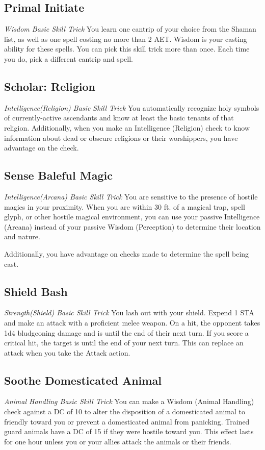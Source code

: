 \subsection{Primal Initiate}
\textit{Wisdom Basic Skill Trick}
You learn one cantrip of your choice from the Shaman list, as well as one spell costing no more than 2 AET. Wisdom is your casting ability for these spells. You can pick this skill trick more than once. Each time you do, pick a different cantrip and spell.

\subsection{Scholar: Religion}
\textit{Intelligence(Religion) Basic Skill Trick}
You automatically recognize holy symbols of currently-active ascendants and know at least the basic tenants of that religion. Additionally, when you make an Intelligence (Religion) check to know information about dead or obscure religions or their worshippers, you have advantage on the check.

\subsection{Sense Baleful Magic}
\textit{Intelligence(Arcana) Basic Skill Trick}
You are sensitive to the presence of hostile magics in your proximity. When you are within 30 ft. of a magical trap, spell glyph, or other hostile magical environment, you can use your passive Intelligence (Arcana) instead of your passive Wisdom (Perception) to determine their location and nature.

Additionally, you have advantage on checks made to determine the spell being cast.

\subsection{Shield Bash}
\textit{Strength(Shield) Basic Skill Trick}
You lash out with your shield. Expend 1 STA and make an attack with a proficient melee weapon. On a hit, the opponent takes 1d4 bludgeoning damage and is  until the end of their next turn. If you score a critical hit, the target is  until the end of your next turn. This can replace an attack when you take the Attack action.

\subsection{Soothe Domesticated Animal}
\textit{Animal Handling Basic Skill Trick}
You can make a Wisdom (Animal Handling) check against a DC of 10 to alter the disposition of a domesticated animal to friendly toward you or prevent a domesticated animal from panicking. Trained guard animals have a DC of 15 if they were hostile toward you. This effect lasts for one hour unless you or your allies attack the animals or their friends.

